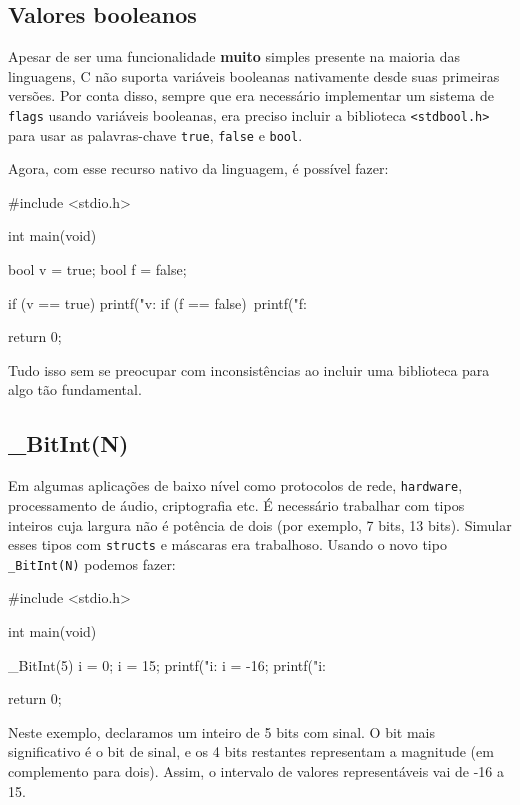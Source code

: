 \subsection{Valores booleanos}

Apesar de ser uma funcionalidade \textbf{muito} simples presente na maioria das 
linguagens, C não suporta variáveis booleanas nativamente desde suas primeiras 
versões. Por conta disso, sempre que era necessário implementar um sistema de 
\texttt{flags} usando variáveis booleanas, era preciso incluir a biblioteca 
\texttt{<stdbool.h>} para usar as palavras-chave \texttt{true}, \texttt{false} 
e \texttt{bool}.

Agora, com esse recurso nativo da linguagem, é possível fazer:

\begin{excode}
#include <stdio.h>

int main(void) {
    bool v = true;
    bool f = false;

    if (v == true)
        printf("v: %
    if (f == false)\
        printf("f: %

    return 0;
}
\end{excode}

Tudo isso sem se preocupar com inconsistências ao incluir uma biblioteca para 
algo tão fundamental.

\subsection{\_BitInt(N)}

Em algumas aplicações de baixo nível como protocolos de rede, \texttt{hardware}, 
processamento de áudio, criptografia etc. É necessário trabalhar com tipos 
inteiros cuja largura não é potência de dois (por exemplo, 7 bits, 13 bits). 
Simular esses tipos com \texttt{structs} e máscaras era trabalhoso. Usando o 
novo tipo \texttt{\_BitInt(N)} podemos fazer:

\begin{excode}
#include <stdio.h>

int main(void) {
    \_BitInt(5) i = 0;
    i = 15;
    printf("i: %
    i = -16;
    printf("i: %

    return 0;
}
\end{excode}

Neste exemplo, declaramos um inteiro de 5 bits com sinal. O bit mais 
significativo é o bit de sinal, e os 4 bits restantes representam a magnitude 
(em complemento para dois). Assim, o intervalo de valores representáveis vai de 
-16 a 15.

